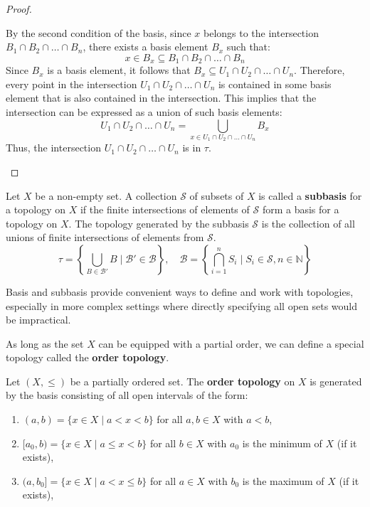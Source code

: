 \begin{proof}
\begin{enumerate}
    By the second condition of the basis, since $x$ belongs to the intersection $B_1 \cap B_2 \cap \ldots \cap B_n$, there exists a basis element $B_x$ such that:
    \[x \in B_x \subseteq B_1 \cap B_2 \cap \ldots \cap B_n \]
    Since $B_x$ is a basis element, it follows that $B_x \subseteq U_1 \cap U_2 \cap \ldots \cap U_n$. Therefore, every point in the intersection $U_1 \cap U_2 \cap \ldots \cap U_n$ is contained in some basis element that is also contained in the intersection. This implies that the intersection can be expressed as a union of such basis elements:
    \[
    U_1 \cap U_2 \cap \ldots \cap U_n = \bigcup_{x \in U_1 \cap U_2 \cap \ldots \cap U_n} B_x
    \]
    Thus, the intersection $U_1 \cap U_2 \cap \ldots \cap U_n$ is in $\tau$.
\end{enumerate}
\end{proof}

\begin{definition}
Let $X$ be a non-empty set. A collection $\mathcal{S}$ of subsets of $X$ is called a \textbf{subbasis} for a topology on $X$ if the finite intersections of elements of $\mathcal{S}$ form a basis for a topology on $X$. The topology generated by the subbasis $\mathcal{S}$ is the collection of all unions of finite intersections of elements from $\mathcal{S}$.
\[
\tau = \left\{\bigcup_{B \in \mathcal{B'}} B \mid \mathcal{B'} \in \mathcal{B}\right\}, \quad \mathcal{B} = \left\{ \bigcap_{i=1}^n S_i \mid S_i \in \mathcal{S}, n \in \mathbb{N} \right\}
\]
\end{definition}

Basis and subbasis provide convenient ways to define and work with topologies, especially in more complex settings where directly specifying all open sets would be impractical.

As long as the set $X$ can be equipped with a partial order, we can define a special topology called the \textbf{order topology}.

\begin{definition}
Let $(X, \leq)$ be a partially ordered set. The \textbf{order topology} on $X$ is generated by the basis consisting of all open intervals of the form:
\begin{enumerate}
    \item $(a, b) = \{ x \in X \mid a < x < b \}$ for all $a, b \in X$ with $a < b$,
    \item $[a_0, b) = \{ x \in X \mid a \leq x < b \}$ for all $b \in X$ with $a_0$ is the minimum of $X$ (if it exists),
    \item $(a, b_0] = \{ x \in X \mid a < x \leq b \}$ for all $a \in X$ with $b_0$ is the maximum of $X$ (if it exists),
\end{enumerate}
\end{definition}

